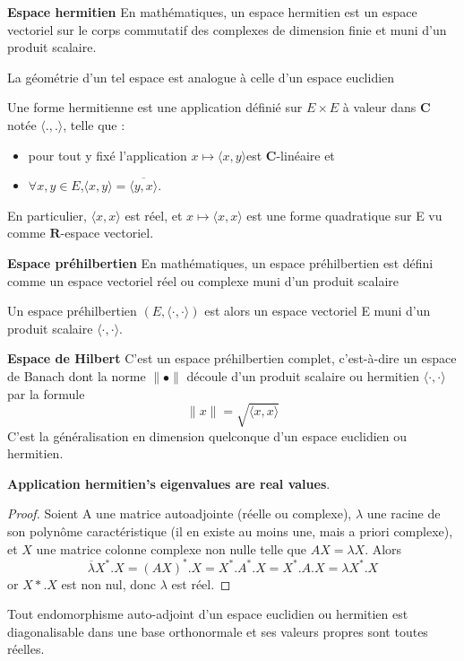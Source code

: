 \documentclass{book}
\begin{document}
\textbf{Espace hermitien}
En math\'ematiques, un espace hermitien est un espace vectoriel sur le corps commutatif des complexes de dimension finie et muni d'un produit scalaire.

La g\'eom\'etrie d'un tel espace est analogue \`a celle d'un espace euclidien

Une forme hermitienne est une application d\'efini\'e sur $E \times E$ \`a valeur dans $\mathbf{C}$ not\'ee $\langle .,.\rangle$, telle que :
\begin{itemize}
		\item pour tout y fix\'e l'application $x \mapsto \langle x,y\rangle $est $\mathbf{C}$-lin\'eaire et
		\item $\forall x,y \in E$,$\langle x,y\rangle=\overline{ \langle y,x\rangle}$.
\end{itemize}
En particulier, $\langle x,x\rangle$ est r\'eel, et $x\mapsto \langle x,x\rangle$ est une forme quadratique sur E vu comme $\mathbf{R}$-espace vectoriel.

\textbf{Espace pr\'ehilbertien}
En math\'ematiques, un espace pr\'ehilbertien est d\'efini comme un espace vectoriel r\'eel ou complexe muni d'un produit scalaire

Un espace pr\'ehilbertien $(E,\langle\cdot,\cdot\rangle)$ est alors un espace vectoriel E muni d'un produit scalaire $\langle\cdot,\cdot\rangle$.

\textbf{Espace de Hilbert}
C'est un espace pr\'ehilbertien complet, c'est-\`a-dire un espace de Banach dont
la norme $\parallel\bullet\parallel$ d\'ecoule d'un produit scalaire ou hermitien $\langle\cdot,\cdot\rangle$ par la formule
$$\parallel x\parallel = \sqrt{\langle x,x \rangle}$$
C'est la g\'en\'eralisation en dimension quelconque d'un espace euclidien ou hermitien.
\bigskip

\textbf{Application hermitien's eigenvalues are real values}.
\begin{proof}
Soient A une matrice autoadjointe (r\'eelle ou complexe), $\lambda$ une racine de son polyn\^ome caract\'eristique (il en existe au moins une,
mais a priori complexe), et $X$ une matrice colonne complexe non nulle telle que
$AX=\lambda X$. Alors
$$ \overline\lambda X^*.X=(AX)^*.X=X^*.A^*.X=X^*.A.X=\lambda X^*.X $$
or $X*.X$ est non nul, donc $\lambda$ est r\'eel.
\end{proof}

\begin{theorem}
Tout endomorphisme auto-adjoint d'un espace euclidien ou hermitien est diagonalisable dans une base orthonormale et ses valeurs propres sont toutes r\'eelles.
\end{theorem}
\end{document}

